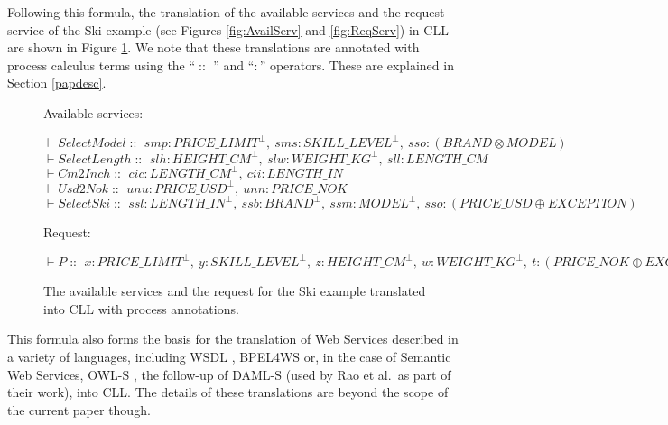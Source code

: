 \documentclass[copyright,creativecommons]{eptcs}
\DeclareMathOperator{\cc}{::\ }
\DeclareMathOperator{\cln}{:}
\begin{document}
Following this formula, the translation of the available services and the request service of the Ski example (see Figures \ref{fig:AvailServ} and \ref{fig:ReqServ}) in CLL are shown in Figure \ref{fig:AvailServCLL}. We note that these translations are annotated with process calculus terms using the ``$\cc$'' and ``$\cln$'' operators. These are explained in Section \ref{papdesc}. 

\begin{figure}[htbp]
\begin{center}
		Available services: \\
		\medskip
\begin{minipage}{.75\linewidth}
\scriptsize
	$\vdash SelectModel\cc smp \cln PRICE\_LIMIT^\bot,\ sms \cln SKILL\_LEVEL^\bot,\ sso \cln (BRAND\otimes MODEL)$ \\
	$\vdash SelectLength \cc slh \cln HEIGHT\_CM^\bot,\ slw \cln WEIGHT\_KG^\bot,\ sll \cln LENGTH\_CM$ \\
	$\vdash Cm2Inch \cc cic \cln LENGTH\_CM^\bot,\ cii \cln LENGTH\_IN$ \\
	$\vdash Usd2Nok \cc unu \cln PRICE\_USD^\bot,\ unn \cln PRICE\_NOK$ \\
	$\vdash SelectSki \cc ssl \cln LENGTH\_IN^\bot,\ ssb \cln BRAND^\bot,\ ssm \cln MODEL^\bot,\ sso \cln (PRICE\_USD\oplus EXCEPTION)$ \\
\end{minipage}
\end{center}
\normalsize	  
\begin{center}
Request:  \\
\medskip
\begin{minipage}{.9\linewidth}
\scriptsize
		$\vdash P \cc x \cln PRICE\_LIMIT^\bot,\ y \cln SKILL\_LEVEL^\bot,\ z \cln HEIGHT\_CM^\bot,\ w \cln WEIGHT\_KG^\bot,\ t \cln (PRICE\_NOK \oplus EXCEPTION)$ \\
\end{minipage}
\end{center}
\normalsize
	\caption{The available services and the request for the Ski example translated into CLL with process annotations.}
	\label{fig:AvailServCLL}
\end{figure}

This formula also forms the basis for the translation of Web Services described in a variety of languages, including WSDL \cite{christensen2001web}, BPEL4WS \cite{andrews2003business} or, in the case of Semantic Web Services, OWL-S \cite{martin2004owl}, the follow-up of DAML-S \cite{coalition2002daml} (used by Rao et al.\ as part of their work), into CLL. The details of these translations are beyond the scope of the current paper though.
\end{document}
